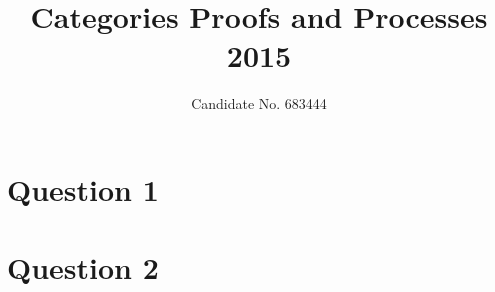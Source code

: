 \documentclass{tufte-handout}
\title{Categories Proofs and Processes 2015}
\author{Candidate No. 683444}
\begin{document}
\maketitle

\section{Question 1}\label{sec:q-1}


\section{Question 2}\label{sec:q-2}

\end{document}
